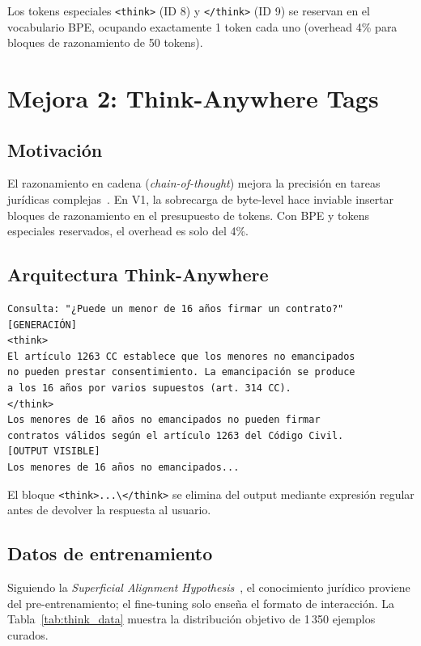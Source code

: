 \documentclass[11pt,a4paper]{article}
\begin{document}
Los tokens especiales \texttt{<think>} (ID 8) y \texttt{</think>} (ID 9) se reservan
en el vocabulario BPE, ocupando exactamente 1 token cada uno (overhead 4\% para bloques
de razonamiento de 50 tokens).

\section{Mejora 2: Think-Anywhere Tags}
\label{sec:think}

\subsection{Motivación}

El razonamiento en cadena (\textit{chain-of-thought}) mejora la precisión en tareas
jurídicas complejas~\citep{wei2022chain}. En V1, la sobrecarga de byte-level hace
inviable insertar bloques de razonamiento en el presupuesto de tokens. Con BPE y
tokens especiales reservados, el overhead es solo del 4\%.

\subsection{Arquitectura Think-Anywhere}

\begin{verbatim}
Consulta: "¿Puede un menor de 16 años firmar un contrato?"
[GENERACIÓN]
<think>
El artículo 1263 CC establece que los menores no emancipados
no pueden prestar consentimiento. La emancipación se produce
a los 16 años por varios supuestos (art. 314 CC).
</think>
Los menores de 16 años no emancipados no pueden firmar
contratos válidos según el artículo 1263 del Código Civil.
[OUTPUT VISIBLE]
Los menores de 16 años no emancipados...
\end{verbatim}

El bloque \texttt{<think>...\textbackslash</think>} se elimina del output mediante
expresión regular antes de devolver la respuesta al usuario.

\subsection{Datos de entrenamiento}

Siguiendo la \textit{Superficial Alignment Hypothesis}~\citep{zhou2023lima}, el
conocimiento jurídico proviene del pre-entrenamiento; el fine-tuning solo enseña
el formato de interacción. La Tabla~\ref{tab:think_data} muestra la distribución
objetivo de 1\,350 ejemplos curados.
\end{document}
